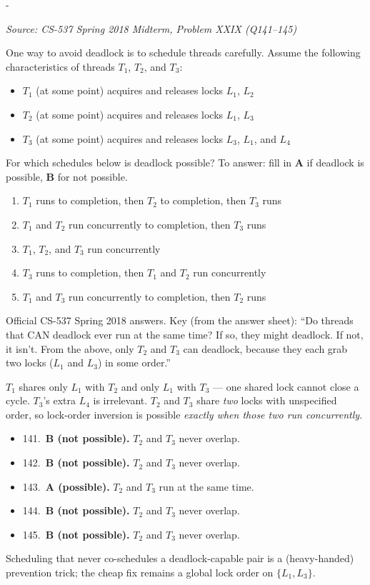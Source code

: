 \documentclass[11pt,a4paper]{article}
\makeatletter
\newcommand{\keepspace}[1]{\par\penalty-100\begingroup
  \setlength{\dimen@}{#1}\dimen@ii\pagegoal\advance\dimen@ii-\pagetotal
  \ifdim\dimen@>\dimen@ii\ifdim\dimen@ii>\z@\vfil\fi\break\fi\endgroup}
\newcounter{qn}[section]
\newenvironment{Qn}[4]{%
  \refstepcounter{qn}\keepspace{7\baselineskip}%
  \begin{tcolorbox}[qboxstyle, title={Q\thesection.\theqn\ \ [#1 \textbar\ #2]\ \ #4}]%
  {\footnotesize\color{g3}\textit{Source: #3}}\par\smallskip%
}{%
  \end{tcolorbox}%
}
\newenvironment{Sol}{%
  \begin{tcolorbox}[sboxstyle, title={Solution}]%
}{%
  \end{tcolorbox}\vspace{0.35em}%
}
\makeatother
\begin{document}
\begin{Qn}{Medium}{Lect 20}{CS-537 Spring 2018 Midterm, Problem XXIX (Q141--145)}{T/F: deadlock possible under which schedules?}
One way to avoid deadlock is to schedule threads carefully. Assume the
following characteristics of threads $T_1$, $T_2$, and $T_3$:
\begin{itemize}
  \item $T_1$ (at some point) acquires and releases locks $L_1$, $L_2$
  \item $T_2$ (at some point) acquires and releases locks $L_1$, $L_3$
  \item $T_3$ (at some point) acquires and releases locks $L_3$, $L_1$,
        and $L_4$
\end{itemize}
For which schedules below is deadlock possible?
To answer: fill in \textbf{A} if deadlock is possible, \textbf{B} for not
possible.
\begin{enumerate}
  \item[141.] $T_1$ runs to completion, then $T_2$ to completion, then
        $T_3$ runs
  \item[142.] $T_1$ and $T_2$ run concurrently to completion, then $T_3$
        runs
  \item[143.] $T_1$, $T_2$, and $T_3$ run concurrently
  \item[144.] $T_3$ runs to completion, then $T_1$ and $T_2$ run
        concurrently
  \item[145.] $T_1$ and $T_3$ run concurrently to completion, then $T_2$
        runs
\end{enumerate}
\end{Qn}
\begin{Sol}
Official CS-537 Spring 2018 answers. Key (from the answer sheet):
``Do threads that CAN deadlock ever run at the same time? If so, they
might deadlock. If not, it isn't. From the above, only $T_2$ and $T_3$
can deadlock, because they each grab two locks ($L_1$ and $L_3$) in some
order.''

$T_1$ shares only $L_1$ with $T_2$ and only $L_1$ with $T_3$ --- one
shared lock cannot close a cycle. $T_3$'s extra $L_4$ is irrelevant.
$T_2$ and $T_3$ share \emph{two} locks with unspecified order, so
lock-order inversion is possible \emph{exactly when those two run
concurrently}.

\begin{itemize}
  \item 141.~\textbf{B (not possible).} $T_2$ and $T_3$ never overlap.
  \item 142.~\textbf{B (not possible).} $T_2$ and $T_3$ never overlap.
  \item 143.~\textbf{A (possible).} $T_2$ and $T_3$ run at the same time.
  \item 144.~\textbf{B (not possible).} $T_2$ and $T_3$ never overlap.
  \item 145.~\textbf{B (not possible).} $T_2$ and $T_3$ never overlap.
\end{itemize}

Scheduling that never co-schedules a deadlock-capable pair is a
(heavy-handed) prevention trick; the cheap fix remains a global lock
order on $\{L_1,L_3\}$.
\end{Sol}
\end{document}
